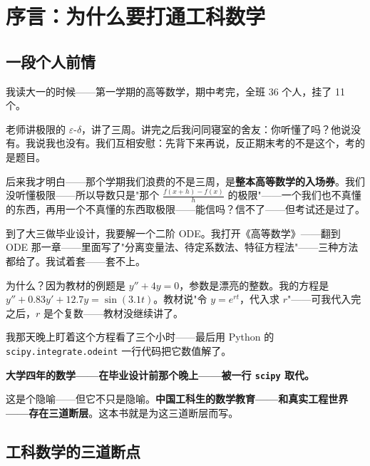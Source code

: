 
\chapter*{序言：为什么要打通工科数学}

\section*{一段个人前情}

我读大一的时候——第一学期的高等数学，期中考完，全班 36 个人，挂了 11 个。

老师讲极限的 $\varepsilon\text{-}\delta$，讲了三周。讲完之后我问同寝室的舍友：你听懂了吗？他说没有。我说我也没有。我们互相安慰：先背下来再说，反正期末考的不是这个，考的是题目。

后来我才明白——那个学期我们浪费的不是三周，是\textbf{整本高等数学的入场券}。我们没听懂极限——所以导数只是"那个 $\frac{f(x+h)-f(x)}{h}$ 的极限"——一个我们也不真懂的东西，再用一个不真懂的东西取极限——能信吗？信不了——但考试还是过了。

\medskip

到了大三做毕业设计，我要解一个二阶 ODE。我打开《高等数学》——翻到 ODE 那一章——里面写了"分离变量法、待定系数法、特征方程法"——三种方法都给了。我试着套——套不上。

为什么？因为教材的例题是 $y'' + 4y = 0$，参数是漂亮的整数。我的方程是 $y'' + 0.83 y' + 12.7 y = \sin(3.1 t)$。教材说"令 $y = e^{rt}$，代入求 $r$"——可我代入完之后，$r$ 是个复数——教材没继续讲了。

我那天晚上盯着这个方程看了三个小时——最后用 Python 的 \texttt{scipy.integrate.odeint} 一行代码把它数值解了。

\textbf{大学四年的数学——在毕业设计前那个晚上——被一行 \texttt{scipy} 取代。}

\medskip

这是个隐喻——但它不只是隐喻。\textbf{中国工科生的数学教育——和真实工程世界——存在三道断层}。这本书就是为这三道断层而写。

\section*{工科数学的三道断点}

